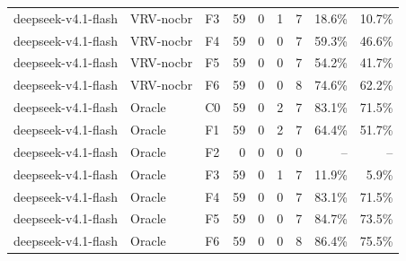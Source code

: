 \begin{tabular}{lllrrrrrr}
deepseek-v4.1-flash & VRV-nocbr & F3 & 59 & 0 & 1 & 7 & 18.6\% & 10.7\% \\
deepseek-v4.1-flash & VRV-nocbr & F4 & 59 & 0 & 0 & 7 & 59.3\% & 46.6\% \\
deepseek-v4.1-flash & VRV-nocbr & F5 & 59 & 0 & 0 & 7 & 54.2\% & 41.7\% \\
deepseek-v4.1-flash & VRV-nocbr & F6 & 59 & 0 & 0 & 8 & 74.6\% & 62.2\% \\
deepseek-v4.1-flash & Oracle & C0 & 59 & 0 & 2 & 7 & 83.1\% & 71.5\% \\
deepseek-v4.1-flash & Oracle & F1 & 59 & 0 & 2 & 7 & 64.4\% & 51.7\% \\
deepseek-v4.1-flash & Oracle & F2 & 0 & 0 & 0 & 0 & -- & -- \\
deepseek-v4.1-flash & Oracle & F3 & 59 & 0 & 1 & 7 & 11.9\% & 5.9\% \\
deepseek-v4.1-flash & Oracle & F4 & 59 & 0 & 0 & 7 & 83.1\% & 71.5\% \\
deepseek-v4.1-flash & Oracle & F5 & 59 & 0 & 0 & 7 & 84.7\% & 73.5\% \\
deepseek-v4.1-flash & Oracle & F6 & 59 & 0 & 0 & 8 & 86.4\% & 75.5\% \\
\bottomrule
\end{tabular}

